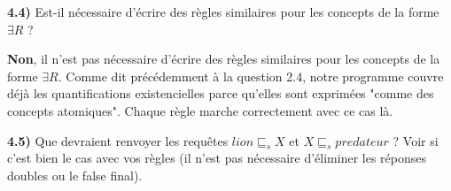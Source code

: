 \documentclass[a4paper,12pt]{report}
\begin{document}
\vspace{0.5cm}

{}

\textbf{4.4)} Est-il nécessaire d'écrire des règles similaires pour les concepts de la forme \(\exists R\) ?



\begin{tcolorbox}[colback=gray!10, colframe=blue!30, coltitle=black, title=Réponse à la question 4.4 - 1/1]

    \textbf{Non}, il n'est pas nécessaire d'écrire des règles similaires pour les concepts de la forme \(\exists R\). Comme dit précédemment à la question 2.4,
        notre programme couvre déjà les quantifications existencielles parce qu'elles sont exprimées "comme des concepts atomiques". Chaque règle marche correctement
        avec ce cas là.


\end{tcolorbox}




\newpage

{}

\textbf{4.5)} Que devraient renvoyer les requêtes \(lion \sqsubseteq_s X\) et \(X \sqsubseteq_s predateur\) ? Voir si c'est bien le cas avec vos règles
    (il n'est pas nécessaire d'éliminer les réponses doubles ou le false final).
\end{document}
